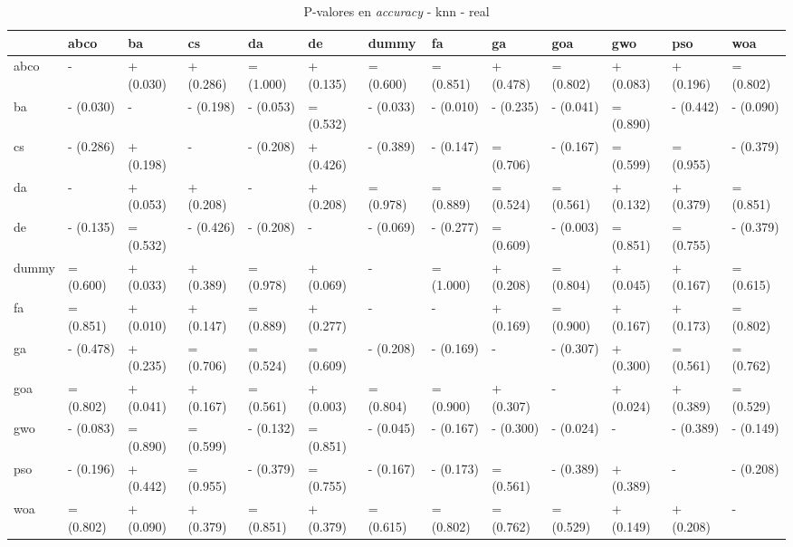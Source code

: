 \begin{table}
    \centering
    \begin{adjustbox}{width=\linewidth}
        \begin{tabular}{lllllllllllll}
            \toprule
            {}    & abco      & ba        & cs        & da        & de        & dummy     & fa        & ga        & goa       & gwo       & pso       & woa       \\
            \midrule
            abco  & -         & + (0.030) & + (0.286) & = (1.000) & + (0.135) & = (0.600) & = (0.851) & + (0.478) & = (0.802) & + (0.083) & + (0.196) & = (0.802) \\
            ba    & - (0.030) & -         & - (0.198) & - (0.053) & = (0.532) & - (0.033) & - (0.010) & - (0.235) & - (0.041) & = (0.890) & - (0.442) & - (0.090) \\
            cs    & - (0.286) & + (0.198) & -         & - (0.208) & + (0.426) & - (0.389) & - (0.147) & = (0.706) & - (0.167) & = (0.599) & = (0.955) & - (0.379) \\
            da    & -         & + (0.053) & + (0.208) & -         & + (0.208) & = (0.978) & = (0.889) & = (0.524) & = (0.561) & + (0.132) & + (0.379) & = (0.851) \\
            de    & - (0.135) & = (0.532) & - (0.426) & - (0.208) & -         & - (0.069) & - (0.277) & = (0.609) & - (0.003) & = (0.851) & = (0.755) & - (0.379) \\
            dummy & = (0.600) & + (0.033) & + (0.389) & = (0.978) & + (0.069) & -         & = (1.000) & + (0.208) & = (0.804) & + (0.045) & + (0.167) & = (0.615) \\
            fa    & = (0.851) & + (0.010) & + (0.147) & = (0.889) & + (0.277) & -         & -         & + (0.169) & = (0.900) & + (0.167) & + (0.173) & = (0.802) \\
            ga    & - (0.478) & + (0.235) & = (0.706) & = (0.524) & = (0.609) & - (0.208) & - (0.169) & -         & - (0.307) & + (0.300) & = (0.561) & = (0.762) \\
            goa   & = (0.802) & + (0.041) & + (0.167) & = (0.561) & + (0.003) & = (0.804) & = (0.900) & + (0.307) & -         & + (0.024) & + (0.389) & = (0.529) \\
            gwo   & - (0.083) & = (0.890) & = (0.599) & - (0.132) & = (0.851) & - (0.045) & - (0.167) & - (0.300) & - (0.024) & -         & - (0.389) & - (0.149) \\
            pso   & - (0.196) & + (0.442) & = (0.955) & - (0.379) & = (0.755) & - (0.167) & - (0.173) & = (0.561) & - (0.389) & + (0.389) & -         & - (0.208) \\
            woa   & = (0.802) & + (0.090) & + (0.379) & = (0.851) & + (0.379) & = (0.615) & = (0.802) & = (0.762) & = (0.529) & + (0.149) & + (0.208) & -         \\
            \bottomrule
        \end{tabular}
    \end{adjustbox}
    \caption{P-valores en \textit{accuracy} - knn - real}
    \label{tab:p-values_accuracy_real_knn}
\end{table}

